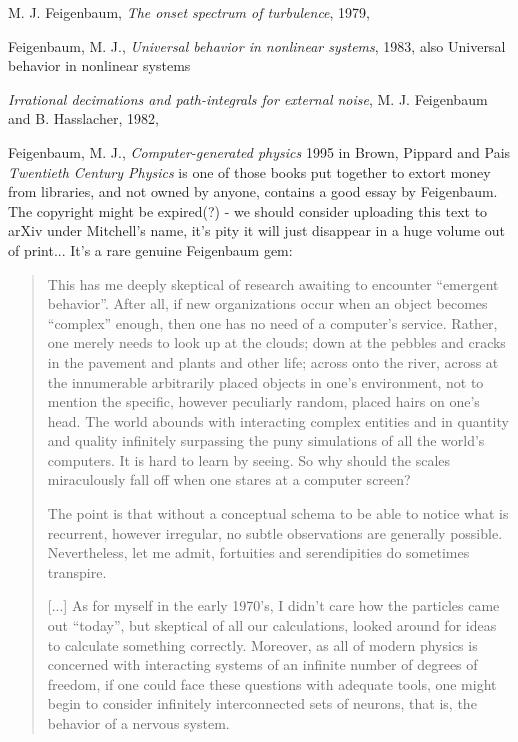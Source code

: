\begin{description}
{M. J. Feigenbaum},
{\em The onset spectrum of turbulence},
{1979},

{Feigenbaum, M. J.},
{\em Universal behavior in nonlinear systems},
{1983},
also
{Universal behavior in nonlinear systems}

{\em Irrational decimations and path-integrals for external noise},
{M. J. Feigenbaum and B. Hasslacher},
{1982},

{Feigenbaum, M. J.},
{\em Computer-generated physics}
1995 in {Brown, Pippard  and Pais}
{\em {Twentieth Century Physics}}
is one of those books put together to extort money from libraries, and
not owned by anyone, contains a good essay by Feigenbaum. The copyright
might be expired(?) - we should consider uploading this text to arXiv
under Mitchell's name, it's pity it will just disappear in a huge volume
out of print... It's a rare genuine Feigenbaum gem:

\begin{quote}
This has me deeply skeptical of research awaiting to encounter ``emergent
behavior''. After all, if new organizations occur when an object becomes
``complex'' enough, then one has no need of a computer's service. Rather,
one merely needs to look up at the clouds; down at the pebbles and cracks
in the pavement and plants and other life; across onto the river, across
at the innumerable arbitrarily placed objects in one's environment, not
to mention the specific, however peculiarly random, placed hairs on one's
head. The world abounds with interacting complex entities and in quantity
and quality infinitely surpassing the puny simulations of all the world's
computers. It is hard to learn by seeing. So why should the scales
miraculously fall off when one stares at a computer screen?

The point is that without a conceptual schema to be able to notice what
is recurrent, however irregular, no subtle observations are generally
possible. Nevertheless, let me admit, fortuities and serendipities do
sometimes transpire.

[...]
As for myself in the early 1970's, I didn't care how the particles came
out ``today'', but skeptical of all our calculations, looked around for
ideas to calculate something correctly. Moreover, as all of modern
physics is concerned with interacting systems of an infinite number of
degrees of freedom, if one could face these questions with adequate
tools, one might begin to consider infinitely interconnected sets of
neurons, that is, the behavior of a nervous system.


\end{quote}
\end{description}
